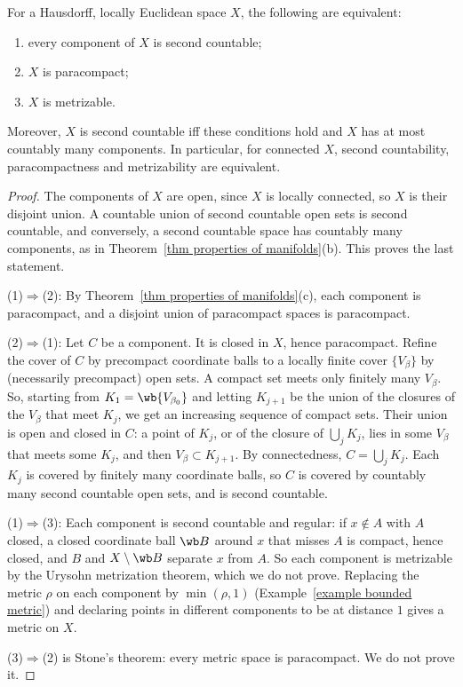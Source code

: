 \begin{prop}\label{prop paracompact vs second countable}
    For a Hausdorff, locally Euclidean space $X$, the following are equivalent:
    \begin{enumerate}
        \item every component of $X$ is second countable;
        \item $X$ is paracompact;
        \item $X$ is metrizable.
    \end{enumerate}
    Moreover, $X$ is second countable iff these conditions hold and $X$ has at most countably many components. In particular, for connected $X$, second countability, paracompactness and metrizability are equivalent.
\end{prop}
\begin{proof}
    The components of $X$ are open, since $X$ is locally connected, so $X$ is their disjoint union. A countable union of second countable open sets is second countable, and conversely, a second countable space has countably many components, as in Theorem~\ref{thm properties of manifolds}(b). This proves the last statement.

    (1)$\Rightarrow$(2): By Theorem~\ref{thm properties of manifolds}(c), each component is paracompact, and a disjoint union of paracompact spaces is paracompact.

    (2)$\Rightarrow$(1): Let $C$ be a component. It is closed in $X$, hence paracompact. Refine the cover of $C$ by precompact coordinate balls to a locally finite cover $\{V_\beta\}$ by (necessarily precompact) open sets. A compact set meets only finitely many $V_\beta$. So, starting from $K_1=\wb{V_{\beta_0}}$ and letting $K_{j+1}$ be the union of the closures of the $V_\beta$ that meet $K_j$, we get an increasing sequence of compact sets. Their union is open and closed in $C$: a point of $K_j$, or of the closure of $\bigcup_jK_j$, lies in some $V_\beta$ that meets some $K_j$, and then $V_\beta\subset K_{j+1}$. By connectedness, $C=\bigcup_jK_j$. Each $K_j$ is covered by finitely many coordinate balls, so $C$ is covered by countably many second countable open sets, and is second countable.

    (1)$\Rightarrow$(3): Each component is second countable and regular: if $x\notin A$ with $A$ closed, a closed coordinate ball $\wb B$ around $x$ that misses $A$ is compact, hence closed, and $B$ and $X\setminus\wb B$ separate $x$ from $A$. So each component is metrizable by the Urysohn metrization theorem, which we do not prove. Replacing the metric $\rho$ on each component by $\min(\rho,1)$ (Example~\ref{example bounded metric}) and declaring points in different components to be at distance $1$ gives a metric on $X$.

    (3)$\Rightarrow$(2) is Stone's theorem: every metric space is paracompact. We do not prove it.
\end{proof}

